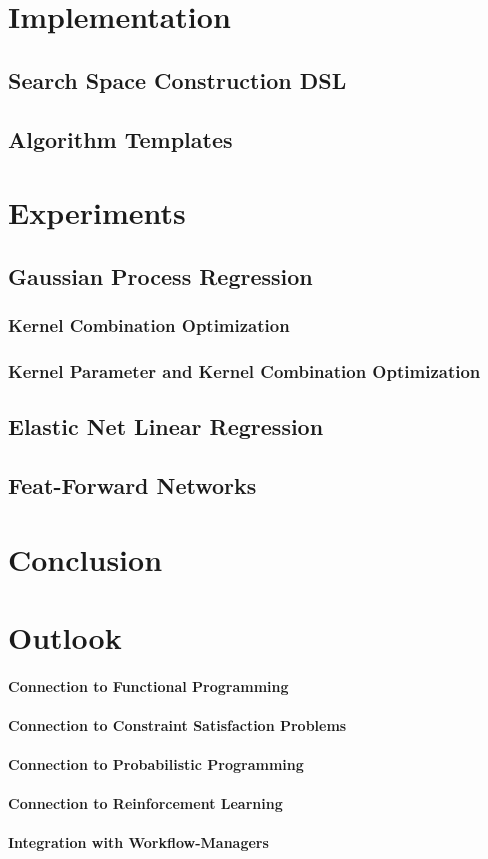 \documentclass[english]{article}
\begin{document}
\section{Implementation}
\subsection{Search Space Construction DSL}
\subsection{Algorithm Templates}


\section{Experiments}
\subsection{Gaussian Process Regression}
\subsubsection{Kernel Combination Optimization}
\subsubsection{Kernel Parameter and Kernel Combination Optimization}
\subsection{Elastic Net Linear Regression}
\subsection{Feat-Forward Networks}

\section{Conclusion}

\section{Outlook}
\paragraph{Connection to Functional Programming}
\paragraph{Connection to Constraint Satisfaction Problems}
\paragraph{Connection to Probabilistic Programming}
\paragraph{Connection to Reinforcement Learning}
\paragraph{Integration with Workflow-Managers}
\paragraph{}

\printbibliography
\end{document}
